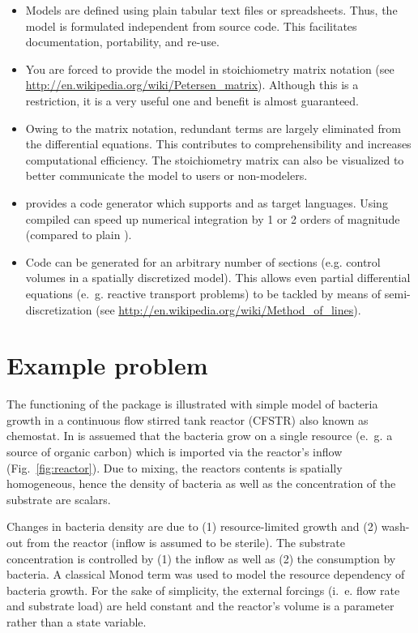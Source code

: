 \documentclass[onecolumn]{article}
\begin{document}
\begin{itemize}
\item Models are defined using plain tabular text files or spreadsheets. Thus, the model is formulated independent from source code. This facilitates documentation, portability, and re-use.
\item You are forced to provide the model in stoichiometry matrix notation (see \url{http://en.wikipedia.org/wiki/Petersen_matrix}). Although this is a restriction, it is a very useful one and benefit is almost guaranteed.
\item Owing to the matrix notation, redundant terms are largely eliminated from the differential equations. This contributes to comprehensibility and increases computational efficiency. The stoichiometry matrix can also be visualized to better communicate the model to users or non-modelers.
\item {} provides a code generator which supports  and  as target languages. Using compiled  can speed up numerical integration by 1 or 2 orders of magnitude (compared to plain ).
\item Code can be generated for an arbitrary number of sections (e.g. control volumes in a spatially discretized model). This allows even partial differential equations (e.~g. reactive transport problems) to be tackled by means of semi-discretization  (see \url{http://en.wikipedia.org/wiki/Method_of_lines}).
\end{itemize}

\section{Example problem}
The functioning of the package is illustrated with simple model of bacteria growth in a continuous flow stirred tank reactor (CFSTR) also known as chemostat. In is assuemed that the bacteria grow on a single resource (e.~g. a source of organic carbon) which is imported via the reactor's inflow (Fig.~\ref{fig:reactor}). Due to mixing, the reactors contents is spatially homogeneous, hence the density of bacteria as well as the concentration of the substrate are scalars.

Changes in bacteria density are due to (1) resource-limited growth and (2) wash-out from the reactor (inflow is assumed to be sterile). The substrate concentration is controlled by (1) the inflow as well as (2) the consumption by bacteria. A classical Monod term was used to model the resource dependency of bacteria growth. For the sake of simplicity, the external forcings (i.~e. flow rate and substrate load) are held constant and the reactor's volume is a parameter rather than a state variable.
\end{document}
